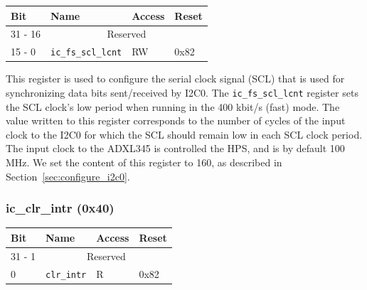 \documentclass[11pt, twoside, pdftex]{article}
\begin{document}
\begin{table}[H]
    \centering
    \begin{tabular}{|l|l|l|l|}
        \hline
            \textbf{Bit}
            & \textbf{Name}
            & \textbf{Access}
            & \textbf{Reset}
        \\\hline
            31 - 16
            & \multicolumn{3}{|c|}{Reserved}
        \\\hline
            15 - 0
            & \texttt{ic\_fs\_scl\_lcnt}
            & RW
            & 0x82
        \\\hline
    \end{tabular}
\end{table}

This register is used to configure the serial clock signal (SCL) that is used for synchronizing data bits sent/received by I2C0. The \texttt{ic\_fs\_scl\_lcnt} register sets the SCL clock's low period when running in the 400 kbit/s (fast) mode. The value written to this register corresponds to the number of cycles of the input clock to the I2C0 for which the SCL should remain low in each SCL clock period. The input clock to the ADXL345 is controlled the HPS, and is by default 100 MHz. We set the content of this register to 160, as described in Section~\ref{sec:configure_i2c0}.%

\subsubsection{ic\_clr\_intr (0x40)}

\begin{table}[H]
    \centering
    \begin{tabular}{|l|l|l|l|}
        \hline
            \textbf{Bit}
            & \textbf{Name}
            & \textbf{Access}
            & \textbf{Reset}
        \\\hline
            31 - 1
            & \multicolumn{3}{|c|}{Reserved}
        \\\hline
            0
            & \texttt{clr\_intr}
            & R
            & 0x82
        \\\hline
    \end{tabular}
\end{table}
\end{document}
